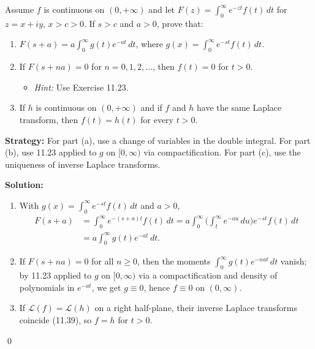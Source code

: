 \begin{problembox}
\begin{problemstatement}
Assume $f$ is continuous on $(0, +\infty)$ and let $F(z) = \int_0^\infty e^{-zt} f(t) \, dt$ for $z = x + iy$, $x > c > 0$. If $s > c$ and $a > 0$, prove that:
\begin{enumerate}[label=(\alph*)]
\item $F(s + a) = a \int_0^\infty g(t) e^{-at} \, dt$, where $g(x) = \int_0^\infty e^{-st} f(t) \, dt$.
\item If $F(s + na) = 0$ for $n = 0, 1, 2, \dots$, then $f(t) = 0$ for $t > 0$.
\begin{itemize}
\item \textit{Hint:} Use Exercise 11.23.
\end{itemize}
\item If $h$ is continuous on $(0, +\infty)$ and if $f$ and $h$ have the same Laplace transform, then $f(t) = h(t)$ for every $t > 0$.
\end{enumerate}
\end{problemstatement}
\end{problembox}

\noindent\textbf{Strategy:} For part (a), use a change of variables in the double integral. For part (b), use 11.23 applied to $g$ on $[0,\infty)$ via compactification. For part (c), use the uniqueness of inverse Laplace transforms.

\bigskip\noindent\textbf{Solution:}
\begin{enumerate}[label=(\alph*)]
\item With $g(x)=\int_0^{\infty} e^{-st} f(t)\,dt$ and $a>0$,
\begin{align*} 
F(s+a)&=\int_0^{\infty} e^{-(s+a)t}f(t)\,dt=a\int_0^{\infty} \Big(\int_t^{\infty} e^{-au}\,du\Big) e^{-st}f(t)\,dt\\
&=a\int_0^{\infty} g(t)e^{-at}\,dt.
\end{align*}
\item If $F(s+na)=0$ for all $n\ge0$, then the moments $\int_0^{\infty} g(t) e^{-nat}\,dt$ vanish; by 11.23 applied to $g$ on $[0,\infty)$ via a compactification and density of polynomials in $e^{-at}$, we get $g\equiv0$, hence $f\equiv0$ on $(0,\infty)$.
\item If $\mathcal L(f)=\mathcal L(h)$ on a right half-plane, their inverse Laplace transforms coincide (11.39), so $f=h$ for $t>0$.
\end{enumerate}\qed


